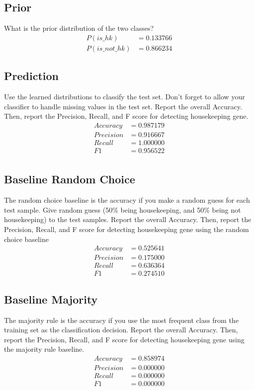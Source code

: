 \documentclass[12pt]{article}
\begin{document}
\subsection{Prior}
What is the prior distribution of the two classes?
\begin{align*}
P(is\_hk) &= 0.133766 \\
P(is\_not\_hk) &= 0.866234
\end{align*}

\subsection{Prediction}
Use the learned distributions to classify the test set. Don’t forget to allow
your classifier to handle missing values in the test set. Report the overall
Accuracy. Then, report the Precision, Recall, and F score for detecting
housekeeping gene.
\begin{align*}
Accuracy &= 0.987179 \\
Precision &= 0.916667 \\
Recall &= 1.000000 \\
F1 &= 0.956522 \\
\end{align*}

\subsection{Baseline Random Choice}
The random choice baseline is the accuracy if you make a random guess for
each test sample. Give random guess (50\% being housekeeping, and 50\%
being not housekeeping) to the test samples. Report the overall Accuracy.
Then, report the Precision, Recall, and F score for detecting housekeeping
gene using the random choice baseline
\begin{align*}
Accuracy &= 0.525641 \\
Precision &= 0.175000 \\
Recall &= 0.636364 \\
F1 &= 0.274510
\end{align*}

\subsection{Baseline Majority}
The majority rule is the accuracy if you use the most frequent class from the
training set as the classification decision. Report the overall Accuracy. Then,
report the Precision, Recall, and F score for detecting housekeeping gene using
the majority rule baseline.
\begin{align*}
Accuracy &= 0.858974 \\
Precision &= 0.000000 \\
Recall &= 0.000000 \\
F1 &= 0.000000
\end{align*}
\end{document}
